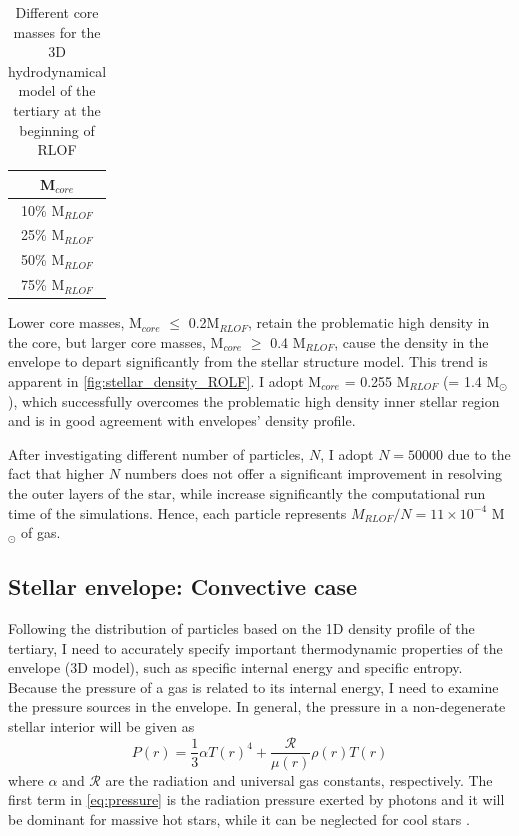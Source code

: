 \begin{table}[H]
    \centering
    \begin{tabular}{| c |}
       M$_{core}$  \\
       \hline
       10\% M$_{RLOF}$\\
       25\% M$_{RLOF}$\\
       50\% M$_{RLOF}$\\
       75\% M$_{RLOF}$
    \end{tabular}
    \caption{ Different core masses for the 3D hydrodynamical model of the tertiary at the beginning of RLOF}
    \label{tab:core_masses_ROLF}
\end{table}
Lower core masses, M$_{core}$ $\leq$ 0.2M$_{RLOF}$, retain the problematic high density in the core, but larger core masses, M$_{core}$ $\geq$ 0.4 M$_{RLOF}$, cause the density in the envelope to depart significantly from the stellar structure model. This trend is apparent in \cref{fig:stellar_density_ROLF}. I adopt M$_{core}$ = 0.255 M$_{RLOF}$ (= 1.4 M$_{\odot}$), which successfully overcomes the problematic high density inner stellar region and is in good agreement with envelopes' density profile.

After investigating different number of particles, $N$, I adopt $N=50000$  due to the fact that higher $N$ numbers does not offer a significant improvement in resolving the outer layers of the star, while increase significantly the computational run time of the simulations.  Hence, each particle represents $M_{RLOF}/N = 11 \times 10^{-4}$ M$_{\odot}$ of gas.

\subsection{Stellar envelope: Convective case}\label{sub:envelope_conv}

Following the distribution of particles based on the 1D density profile of the tertiary, I need to accurately specify important thermodynamic properties of the envelope (3D model), such as specific internal energy and specific entropy. Because the pressure of a gas is related to its internal energy, I need to examine the pressure sources in the envelope. In general, the pressure in a non-degenerate stellar interior will be given as 
\begin{equation}\label{eq:pressure}
    P(r) = \frac{1}{3} \alpha T(r)^4+ \frac{\mathcal{R}}{\mu(r)} \rho(r) T(r)
\end{equation}
where $\alpha$ and $\mathcal{R}$ are the radiation and universal gas constants, respectively. The first term in \cref{eq:pressure} is the radiation pressure exerted by photons and it will be dominant for massive hot stars, while it can be neglected for cool stars \citep{pols2011stellar}.

